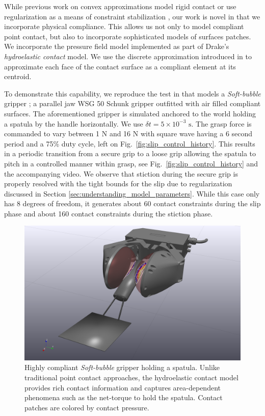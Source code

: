 While previous work on convex approximations model rigid contact
\cite{bib:anitescu2006,bib:mazhar2014} or use regularization as a means of
constraint stabilization \cite{bib:todorov2014}, our work is novel in that we
incorporate physical compliance. This allows us not only to model compliant
point contact, but also to incorporate sophisticated models of surfaces patches.
We incorporate the pressure field model \cite{bib:elandt2019pressure}
implemented as part of Drake's \cite{bib:drake} \emph{hydroelastic contact}
model. We use the discrete approximation introduced in
\cite{bib:masterjohn2021discrete} to approximate each face of the contact
surface as a compliant element at its centroid.

To demonstrate this capability, we reproduce the test in
\cite{bib:masterjohn2021discrete} that models a \emph{Soft-bubble} gripper
\cite{bib:kuppuswamy2020soft}; a parallel jaw WSG 50 Schunk gripper outfitted
with air filled compliant surfaces. The aforementioned gripper is simulated
anchored to the world holding a spatula by the handle horizontally. We use
$\delta t=5\times 10^{-3}\text{ s}$. The grasp force is commanded to vary
between 1 N and 16 N with square wave having a 6 second period and a 75\% duty
cycle, left on Fig.~\ref{fig:slip_control_history}. This results in a periodic
transition from a secure grip to a loose grip allowing the spatula to pitch in a
controlled manner within grasp, see Fig.~\ref{fig:slip_control_history} and the
accompanying video. We observe that stiction during the secure grip is properly
resolved with the tight bounds for the slip due to regularization discussed in
Section \ref{sec:understanding_model_parameters}. While this case only has 8 degrees
of freedom, it generates about 60 contact constraints during the slip phase and
about 160 contact constraints during the stiction phase.

\begin{figure}[!h]
	\centering
	\includegraphics[width=0.8\columnwidth]{figures/slip_control/slip_control_single_frame.png}
	\caption{\label{fig:slip_control_frame} 
	Highly compliant \emph{Soft-bubble} gripper \cite{bib:kuppuswamy2020soft}
	holding a spatula. Unlike traditional point contact approaches, the
	hydroelastic contact model provides rich contact information and captures
	area-dependent phenomena such as the net-torque to hold the spatula. Contact
	patches are colored by contact pressure.}
\end{figure}

